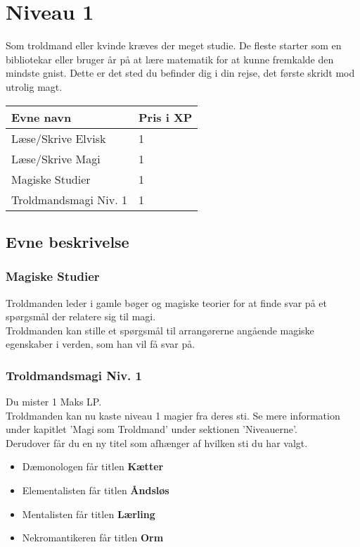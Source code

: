 \chapter{Niveau 1}
Som troldmand eller kvinde kræves der meget studie. De fleste starter som en bibliotekar eller bruger år på at lære matematik for at kunne fremkalde den mindste gnist. Dette er det sted du befinder dig i din rejse, det første skridt mod utrolig magt. 

\begin{table}[H]
    \centering
    \begin{tabular}{|p{}|p{}|}
    \rowcolor{cerulean!80}\hline
        Evne navn & Pris i XP \\\hline
        Læse/Skrive Elvisk & 1\\\hline
        Læse/Skrive Magi & 1\\\hline
        Magiske Studier & 1\\\hline
        Troldmandsmagi Niv. 1 & 1\\\hline
    \end{tabular}
\end{table}

\section{Evne beskrivelse}





\subsection{Magiske Studier}
Troldmanden leder i gamle bøger og magiske teorier for at finde svar på et spørgsmål der relatere sig til magi.\\
Troldmanden kan stille et spørgsmål til arrangørerne angående magiske egenskaber i verden, som han vil få svar på.

\subsection{Troldmandsmagi Niv. 1}
Du mister 1 Maks LP.\\
Troldmanden kan nu kaste niveau 1 magier fra deres sti. Se mere information under kapitlet 'Magi som Troldmand' under sektionen 'Niveauerne'. \\
Derudover får du en ny titel som afhænger af hvilken sti du har valgt.\\
\begin{itemize}
    \item Dæmonologen får titlen \textbf{Kætter}
    \item Elementalisten får titlen \textbf{Åndsløs}
    \item Mentalisten får titlen \textbf{Lærling}
    \item Nekromantikeren får titlen \textbf{Orm}
\end{itemize}
